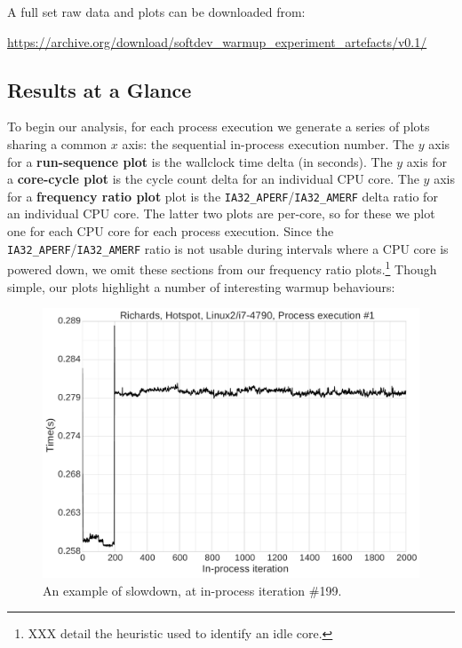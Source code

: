 \documentclass[preprint,numbers,10pt]{sigplanconf}
\begin{document}
A full set raw data and plots can be downloaded from:
\vspace{-.5em}
\begin{center}
{\small%
\url{https://archive.org/download/softdev_warmup_experiment_artefacts/v0.1/}
}
\end{center}

\subsection{Results at a Glance}

To begin our analysis, for each
process execution we generate a series of plots sharing a common $x$
axis: the sequential in-process execution number. The $y$ axis for a
\textbf{run-sequence plot} is the wallclock time delta (in seconds). The $y$
axis for a \textbf{core-cycle plot} is the cycle count delta for an individual
CPU core. The $y$ axis for a \textbf{frequency ratio plot} plot is the
\texttt{IA32\_APERF}/\texttt{IA32\_AMERF} delta ratio for an individual CPU
core. The latter two plots are per-core, so for these we plot one for each CPU
core for each process execution. Since the
\texttt{IA32\_APERF}/\texttt{IA32\_AMERF} ratio is not usable during intervals
where a CPU core is powered down, we omit these sections from our frequency
ratio plots.\footnote{XXX detail the heuristic used to identify an idle core.}
Though simple, our plots highlight a number of interesting warmup behaviours:

\begin{figure}[tbp]
\includegraphics[width=.475\textwidth]{examples/slowdown1}
\caption{An example of slowdown, at in-process iteration \#199.}
\label{fig:examples:slowdown1}
\end{figure}
\end{document}
